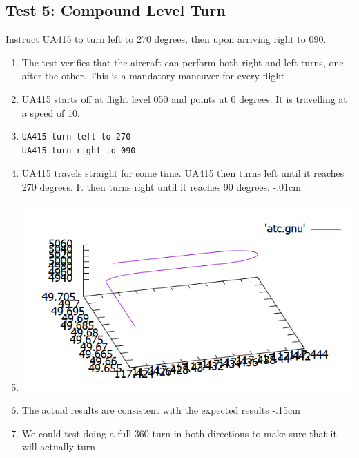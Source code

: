 \documentclass[letterpaper, 12pt]{article}
\begin{document}
\subsection{Test 5: Compound Level Turn}
Instruct UA415 to turn left to 270 degrees, then upon arriving right to 090.
\begin{enumerate}\itemsep-.15cm
\item The test verifies that the aircraft can perform both right and left turns, one after the other. This is a mandatory maneuver for every flight
\item UA415 starts off at flight level 050 and points at 0 degrees. It is travelling at a speed of 10.
\item \begin{verbatim}UA415 turn left to 270
UA415 turn right to 090
\end{verbatim}
\item UA415 travels straight for some time. UA415 then turns left until it reaches 270 degrees. It then turns right until it reaches 90 degrees.
\itemsep-.01cm
\item \includegraphics[scale=.55,valign=t,center]{test5.png}
\item The actual results are consistent with the expected results
\itemsep-.15cm
\item We could test doing a full 360 turn in both directions to make sure that it will actually turn
\end{enumerate}
\end{document}

